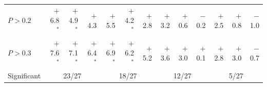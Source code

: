 \begin{table}[tp]
\begin{tabular}{lrrrrrrrrrrrr}
$P>0.2$ & $+$6.8$^\ast$ & $+$4.9$^\ast$ & $+$4.3 & $+$5.5 & $+$4.2$^\ast$ & $+$2.8 & $+$3.2 & $+$0.6 & $-$0.2 & $+$2.5 & $+$0.8 & $-$1.0 \\
$P>0.3$ & $+$7.6$^\ast$ & $+$7.1$^\ast$ & $+$6.4$^\ast$ & $+$6.9$^\ast$ & $+$6.2$^\ast$ & $+$5.2 & $+$3.6 & $+$3.0 & $+$0.1 & $+$2.8 & $+$3.0 & $-$0.7 \\
\midrule
Significant & \multicolumn{3}{c}{23/27} & \multicolumn{3}{c}{18/27} & \multicolumn{3}{c}{12/27} & \multicolumn{3}{c}{5/27} \\
\bottomrule
\end{tabular}
\end{table}
